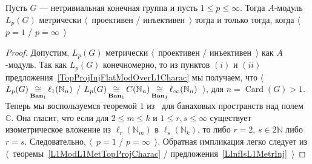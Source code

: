 \begin{proposition}\label{LpFinGrL1MGMetrInjProjCharac} Пусть $G$ ---
нетривиальная конечная группа и пусть $1\leq p\leq \infty$. Тогда $A$-модуль
$L_p(G)$ метрически $\langle$~проективен / инъективен~$\rangle$ тогда и только
тогда, когда $\langle$~$p=1$ / $p=\infty$~$\rangle$
\end{proposition}
\begin{proof} Допустим, $L_p(G)$ метрически $\langle$~проективен /
инъективен~$\rangle$ как $A$-модуль. Так как $L_p(G)$ конечномерно, то из
пунктов $(i)$ и $(ii)$ предложения~\ref{TopProjInjFlatModOverL1Charac} мы
получаем, что 
$\langle$~$L_p(G)\mathop{\mathbin{\cong}}\limits_{\mathbf{Ban}_1}\ell_1(\mathbb{N}_n)$ /
$L_p(G)\mathop{\mathbin{\cong}}\limits_{\mathbf{Ban}_1}C(\mathbb{N}_n)
\mathop{\mathbin{\cong}}\limits_{\mathbf{Ban}_1}\ell_\infty(\mathbb{N}_n)$~$\rangle$, 
для $n=\operatorname{Card}(G)>1$. Теперь мы воспользуемся теоремой
$1$ из~\cite{LyubIsomEmdbFinDimLp} для банаховых пространств над полем
$\mathbb{C}$. Она гласит, что если для $2\leq m\leq k$ и $1\leq r,s\leq \infty$
существует изометрическое вложение из $\ell_r(\mathbb{N}_m)$ в
$\ell_s(\mathbb{N}_k)$, то либо $r=2$, $s\in 2\mathbb{N}$ либо $r=s$.
Следовательно, $\langle$~$p=1$ / $p=\infty$~$\rangle$. Обратная импликация легко
следует из $\langle$~теоремы~\ref{L1ModL1MetTopProjCharac} /
предложения~\ref{LInfIsL1MetrInj}~$\rangle$
\end{proof}

